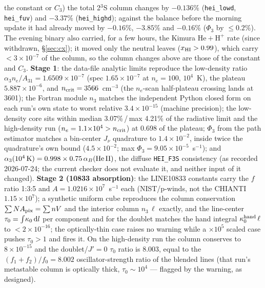 \documentclass[english,a4paper]{my_memo}
\newcommand{\code}[1]{\texttt{#1}}
\begin{document}
the constant or $C_3$) the total 2$^3$S column changes by $-0.136\%$
(\code{hei\_lowd}, \code{hei\_fuv}) and $-3.37\%$ (\code{hei\_highd});
against the balance before the morning update it had already moved by
$-0.16\%$, $-3.85\%$ and $-0.16\%$ ($\Phi_3$ by $\le 0.2\%$).  The
evening binary also carried, for a few hours, the Kimura
$\mathrm{He}+\mathrm{H}^+$ rate (since withdrawn, \S\ref{sec:cx}); it moved
only the neutral leaves ($x_{\rm HI} > 0.99$), which carry
$<3\times10^{-7}$ of the column, so the column changes above are those of
the constant and $C_3$.
\textbf{Stage 1}: the data-file analytic limits reproduce the low-density
ratio $\alpha_3 n_e/A_{31} = 1.6509{\times}10^{-7}$ (spec
$1.65{\times}10^{-7}$ at $n_e=100$, $10^4$~K), the plateau
$5.887{\times}10^{-6}$, and $n_{\rm crit} = 3566$~cm$^{-3}$ (the $n_e$-scan
half-plateau crossing lands at 3601); the Fortran module $n_3$ matches the
independent Python closed form on each run's own state to worst relative
$3.4{\times}10^{-15}$ (machine precision); the low-density core sits within
median 3.07\%\,/\,max 4.21\% of the radiative limit and the high-density
run ($n_e = 1.1{\times}10^4 > n_{\rm crit}$) at 0.698 of the plateau;
$\Phi_3$ from the path estimator matches a bin-center $J_\nu$ quadrature to
$1.4{\times}10^{-2}$, inside twice the quadrature's own bound
($4.5{\times}10^{-2}$; max $\Phi_3 = 9.05{\times}10^{-5}$~s$^{-1}$); and
$\alpha_3(10^4\,{\rm K}) = 0.998\times0.75\,\alpha_B({\rm He\,II})$, the
diffuse \code{HEI\_F3S} consistency (as recorded 2026-07-24; the current
checker does not evaluate it, and neither input of it changed).  \textbf{Stage 2 (10833 absorption)}:
the LINE10833 constants carry the $f$ ratio 1:3:5 and $A =
1.0216{\times}10^7$~s$^{-1}$ each (NIST/p-winds, not the CHIANTI
$1.15{\times}10^7$); a synthetic uniform cube reproduces the column
conservation $\sum N A_{\rm pix} = \sum n V$ and the interior column
$n_3\,\ell$ exactly, and the line-center $\tau_0 = \int\!\kappa_0\,{\rm d}l$
per component and for the doublet matches the hand integral
$\kappa_0^{\rm hand}\,\ell$ to $<2{\times}10^{-16}$; the optically-thin case
raises no warning while a $\times10^5$ scaled case pushes $\tau_0 > 1$ and
fires it.  On the high-density run the column conserves to
$8{\times}10^{-15}$ and the doublet/$J'{=}0$ $\tau_0$ ratio is 8.003, equal
to the $(f_1{+}f_2)/f_0 = 8.002$ oscillator-strength ratio of the blended
lines (that run's metastable column is optically thick, $\tau_0 \sim
10^4$ --- flagged by the warning, as designed).

\end{document}
